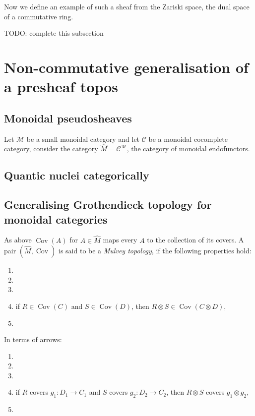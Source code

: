 \documentclass[a4paper]{article}
\theoremstyle{defin}
\theoremstyle{theorem}
\theoremstyle{claim}
\theoremstyle{prop}
\theoremstyle{lemma}
\theoremstyle{fact}
\theoremstyle{ex}
\theoremstyle{col}
\begin{document}
Now we define an example of such a sheaf from the Zariski space, the dual space of a commutative ring.

TODO: complete this subsection

\section{Non-commutative generalisation of a presheaf topos}

\subsection{Monoidal pseudosheaves}
Let $\mathcal{M}$ be a small monoidal category and let $\mathcal{C}$ be a monoidal cocomplete category, consider the category $\widehat{M} = \mathcal{C}^{\mathcal{M}}$, the category of monoidal endofunctors.

\subsection{Quantic nuclei categorically}

\subsection{Generalising Grothendieck topology for monoidal categories}
As above $\operatorname{Cov}(A)$ for $A \in \widehat{M}$ maps every $A$ to the collection of its covers. A pair $(\widehat{M}, \operatorname{Cov})$ is said to be a \emph{Mulvey topology}, if the following properties hold:

\begin{enumerate}
\item
\item
\item
\item if $R \in \operatorname{Cov}(C)$ and $S \in \operatorname{Cov}(D)$, then $R \otimes S \in \operatorname{Cov}(C \otimes D)$,
\item
\end{enumerate}

In terms of arrows:
\begin{enumerate}
\item
\item
\item
\item if $R$ covers $g_1 : D_1 \to C_1$ and $S$ covers $g_2 : D_2 \to C_2$, then $R \otimes S$ covers $g_1 \otimes g_2$,
\item
\end{enumerate}
\end{document}
